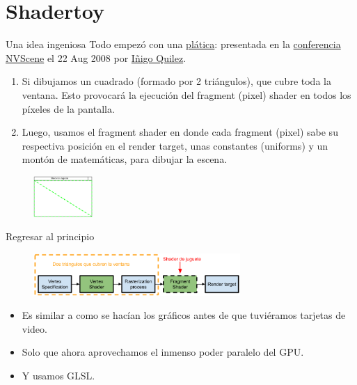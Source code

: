 \section{Shadertoy}

\begin{frame}{Una idea ingeniosa}
Todo empezó con una \href{https://iquilezles.org/articles/nvscene2008/rwwtt.pdf}{plática}:  presentada en la \href{https://www.youtube.com/watch?v=A1iW6Z_Jc4k}{conferencia NVScene} el 22 Aug 2008 por \href{https://iquilezles.org/}{Iñigo Quilez}.
\begin{exampleblock}{}
\begin{enumerate}
    \item Si dibujamos un cuadrado (formado por 2 triángulos), que cubre toda la ventana. Esto provocará la ejecución del fragment (pixel) shader en todos los píxeles de la pantalla. 
    \item Luego, usamos el fragment shader en donde cada fragment (pixel) sabe su respectiva posición en el render target, unas constantes (uniforms) y un montón de matemáticas, para dibujar la escena.
\end{enumerate}
\end{exampleblock}
\begin{figure}[htp]
  \centering
  \includegraphics[width=0.2\textwidth]{img/TwoTriangles}
\end{figure}
\end{frame}

\begin{frame}{Regresar al principio}
\begin{figure}[htp]
  \centering
  \includegraphics[width=0.7\textwidth]{img/Truco}
\end{figure}
\begin{itemize}
    \item Es similar a como se hacían los gráficos antes de que tuviéramos tarjetas de video.
    \item Solo que ahora aprovechamos el \alert{inmenso poder paralelo} del GPU.
    \item Y usamos GLSL.
\end{itemize}
\end{frame}

